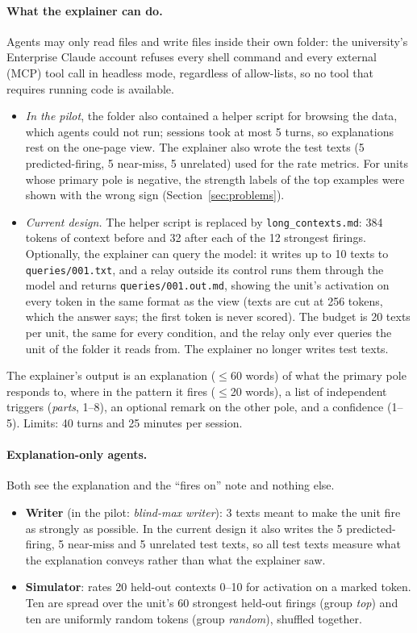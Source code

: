 \documentclass[11pt]{article}
\begin{document}
\paragraph{What the explainer can do.} Agents may only read files and write files inside their own folder: the
university's Enterprise Claude account refuses every shell command and every external (MCP) tool call in headless
mode, regardless of allow-lists, so no tool that requires running code is available.
\begin{itemize}
\item \emph{In the pilot}, the folder also contained a helper script for browsing the data, which agents could not
run; sessions took at most 5 turns, so explanations rest on the one-page view. The explainer also wrote the test texts
(5 predicted-firing, 5 near-miss, 5 unrelated) used for the rate metrics. For units whose primary pole is negative,
the strength labels of the top examples were shown with the wrong sign (Section~\ref{sec:problems}).
\item \emph{Current design.} The helper script is replaced by \texttt{long\_contexts.md}: 384 tokens of context before
and 32 after each of the 12 strongest firings. Optionally, the explainer can query the model: it writes up to 10 texts
to \texttt{queries/001.txt}, and a relay outside its control runs them through the model and returns
\texttt{queries/001.out.md}, showing the unit's activation on every token in the same format as the view (texts are
cut at 256 tokens, which the answer says; the first token is never scored). The budget is 20 texts per unit, the same
for every condition, and the relay only ever queries the unit of the folder it reads from. The explainer no longer
writes test texts.
\end{itemize}
The explainer's output is an explanation ($\le$60 words) of what the primary pole responds to, where in the pattern it
fires ($\le$20 words), a list of independent triggers (\emph{parts}, 1--8), an optional remark on the other pole, and a
confidence (1--5). Limits: 40 turns and 25 minutes per session.

\paragraph{Explanation-only agents.} Both see the explanation and the ``fires on'' note and nothing else.
\begin{itemize}
\item \textbf{Writer} (in the pilot: \emph{blind-max writer}): 3 texts meant to make the unit fire as strongly as
possible. In the current design it also writes the 5 predicted-firing, 5 near-miss and 5 unrelated test texts, so all
test texts measure what the explanation conveys rather than what the explainer saw.
\item \textbf{Simulator}: rates 20 held-out contexts 0--10 for activation on a marked token. Ten are spread over the
unit's 60 strongest held-out firings (group \emph{top}) and ten are uniformly random tokens (group \emph{random}),
shuffled together.
\end{itemize}
\end{document}
